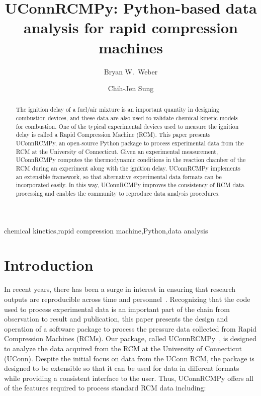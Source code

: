 \documentclass[12pt]{ussci}
\title{ UConnRCMPy: Python-based data analysis for rapid compression machines }
\author[1*]{Bryan W.\ Weber}
\author[1]{Chih-Jen Sung}
\affil[1]{Department of Mechanical Engineering, University of Connecticut, Storrs,
CT, USA}
\affil[*]{Corresponding Author: \email{bryan.weber@uconn.edu}}
\begin{document}
\maketitle

\begin{abstract} %
    The ignition delay of a fuel/air mixture is an important quantity in
    designing combustion devices, and these data are also used to validate
    chemical kinetic models for combustion. One of the typical experimental
    devices used to measure the ignition delay is called a Rapid Compression
    Machine (RCM). This paper presents UConnRCMPy, an open-source Python package
    to process experimental data from the RCM at the University of Connecticut.
    Given an experimental measurement, UConnRCMPy computes the thermodynamic
    conditions in the reaction chamber of the RCM during an experiment along
    with the ignition delay. UConnRCMPy implements an extensible framework, so
    that alternative experimental data formats can be incorporated easily. In
    this way, UConnRCMPy improves the consistency of RCM data processing and
    enables the community to reproduce data analysis procedures.
\end{abstract}

\begin{keyword}
    chemical kinetics\sep rapid compression machine\sep Python\sep data analysis
\end{keyword}

\section{Introduction}\label{introduction}

In recent years, there has been a surge in interest in ensuring that research
outputs are reproducible across time and personnel~\autocite{NatureEds2016}.
Recognizing that the code used to process experimental data is an important part
of the chain from observation to result and publication, this paper presents the
design and operation of a software package to process the pressure data
collected from Rapid Compression Machines (RCMs). Our package, called
UConnRCMPy~\autocite{uconnrcmpy}, is designed to analyze the data acquired from
the RCM at the University of Connecticut (UConn). Despite the initial focus on
data from the UConn RCM, the package is designed to be extensible so that it can
be used for data in different formats while providing a consistent interface to
the user. Thus, UConnRCMPy offers all of the features required to process
standard RCM data including:
\end{document}
